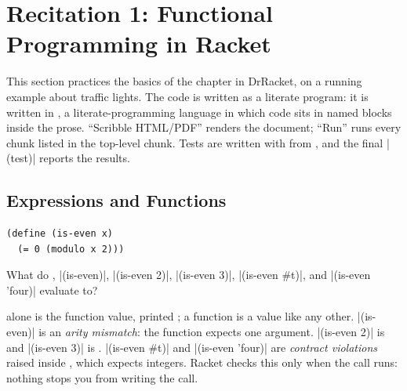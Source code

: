 \section{Recitation 1: Functional Programming in Racket}
\label{sec:rec1}

This section practices the basics of the chapter in DrRacket, on a running example about traffic lights. The code is written as a literate program: it is written in , a literate-programming language in which code sits in named  blocks inside the prose. ``Scribble HTML/PDF'' renders the document; ``Run'' runs every chunk listed in the top-level \code{<*>} chunk. Tests are written with  from , and the final \rkt|(test)| reports the results.

\subsection{Expressions and Functions}

\begin{lstlisting}
(define (is-even x)
  (= 0 (modulo x 2)))
\end{lstlisting}

\begin{exercise}
What do , \rkt|(is-even)|, \rkt|(is-even 2)|, \rkt|(is-even 3)|, \rkt|(is-even #t)|, and \rkt|(is-even 'four)| evaluate to?
\end{exercise}
\begin{solution}
 alone is the function value, printed ; a function is a value like any other. \rkt|(is-even)| is an \emph{arity mismatch}: the function expects one argument. \rkt|(is-even 2)| is  and \rkt|(is-even 3)| is . \rkt|(is-even #t)| and \rkt|(is-even 'four)| are \emph{contract violations} raised inside , which expects integers. Racket checks this only when the call runs: nothing stops you from writing the call.
\end{solution}

